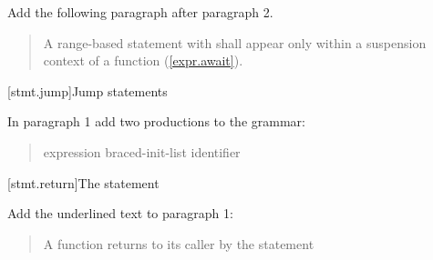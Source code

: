 Add the following paragraph after paragraph 2.

\begin{quote}
	\setcounter{Paras}{2}
	\pnum
	A range-based  statement with  shall appear only within a suspension context of a function (\ref{expr.await}).
\end{quote}
%
%
%
%
%
%
%

\setcounter{section}{5}
[stmt.jump]{Jump statements}%

In paragraph 1 add two productions to the grammar:

\begin{quote}
  \begin{bnf}
    \br
    \br
    \br
     expression\opt \terminal{;}\br
     braced-init-list \terminal{;}\br
     \br
     identifier \terminal{;}
  \end{bnf}
\end{quote}

\setcounter{subsection}{2}
[stmt.return]{The  statement}%
%
%

Add the underlined text to paragraph 1:

\begin{quote}
\pnum
A function returns to its caller by the  statement
\end{quote}

